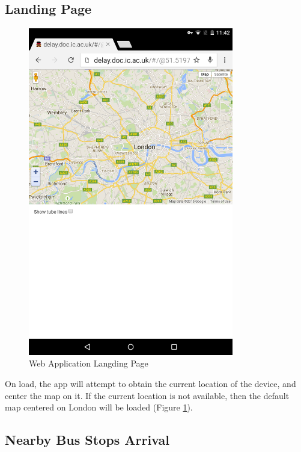 \subsection{Landing Page}

\begin{figure}
\centering
\includegraphics[width=0.8\textwidth]{figures/landing_page.png}
\caption{\label{fig:landing_page} Web Application Langding Page}
\end{figure}

\par On load, the app will attempt to obtain the current location of the device, and center the map on it. If the current location is not available, then the default map centered on London will be loaded (Figure \ref{fig:landing_page}).


\subsection{Nearby Bus Stops Arrival}

